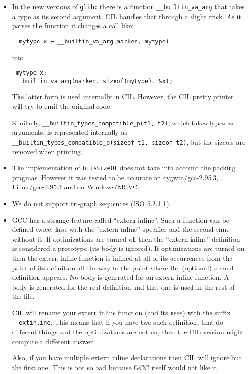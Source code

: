 \documentclass{article}
\def\t#1{{\tt #1}}
\begin{document}
\begin{itemize}

\item In the new versions of \t{glibc} there is a function
  \t{\_\_builtin\_va\_arg} that takes a type as its second argument. CIL
  handles that through a slight trick. As it parses the function it changes a
  call like:
\begin{verbatim}
  mytype x = __builtin_va_arg(marker, mytype)
\end{verbatim}
 into 
\begin{verbatim}
 mytype x;
 __builtin_va_arg(marker, sizeof(mytype), &x);
\end{verbatim}

 The latter form is used internally in CIL. However, the CIL pretty printer
 will try to emit the original code. 

 Similarly, \t{\_\_builtin\_types\_compatible\_p(t1, t2)}, which takes
 types as arguments, is represented internally as
 \t{\_\_builtin\_types\_compatible\_p(sizeof t1, sizeof t2)}, but the
 sizeofs are removed when printing.

\item The implementation of \t{bitsSizeOf} does not take into account the
packing pragmas. However it was tested to be accurate on cygwin/gcc-2.95.3,
Linux/gcc-2.95.3 and on Windows/MSVC.

\item We do not support tri-graph sequences (ISO 5.2.1.1).

\item GCC has a strange feature called ``extern inline''. Such a function can
be defined twice: first with the ``extern inline'' specifier and the second
time without it. If optimizations are turned off then the ``extern inline''
definition is considered a prototype (its body is ignored). If optimizations
are turned on then the extern inline function is inlined at all of its
occurrences from the point of its definition all the way to the point where the
(optional) second definition appears. No body is generated for an extern
inline function. A body is generated for the real definition and that one is
used in the rest of the file. 

 CIL will rename your extern inline function (and its uses) with the suffix
 \t{\_\_extinline}. This means that if you have two such definition, that do
 different things and the optimizations are not on, then the CIL version might
 compute a different answer !

 Also, if you have multiple extern inline declarations then CIL will ignore
but the first one. This is not so bad because GCC itself would not like it. 


\end{itemize}
\end{document}
